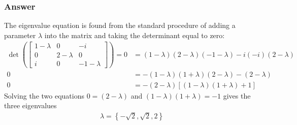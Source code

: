 \subsubsection{Answer}

The eigenvalue equation is found from the standard procedure of adding a
parameter $λ$ into the matrix and taking the determinant equal to zero:
\begin{align*}
    \det ( \begin{bmatrix}
	1-λ & 0   & -i   \\
	0   & 2-λ & 0    \\
	i   & 0   & -1-λ
    \end{bmatrix} ) = 0 &= (1-λ)(2-λ)(-1-λ) - i(-i)(2-λ) \\
    0 &= -(1-λ)(1+λ)(2-λ) - (2-λ) \\
    0 &= -(2-λ)\left[ (1-λ)(1+λ) + 1 \right]
\end{align*}
Solving the two equations $0 = (2 - λ)$ and $(1-λ)(1+λ) = -1$ gives the three
eigenvalues
\begin{align}
    \boxed{
    λ = \left\{ -\sqrt 2, \sqrt 2, 2 \right\}
    }
\end{align}


